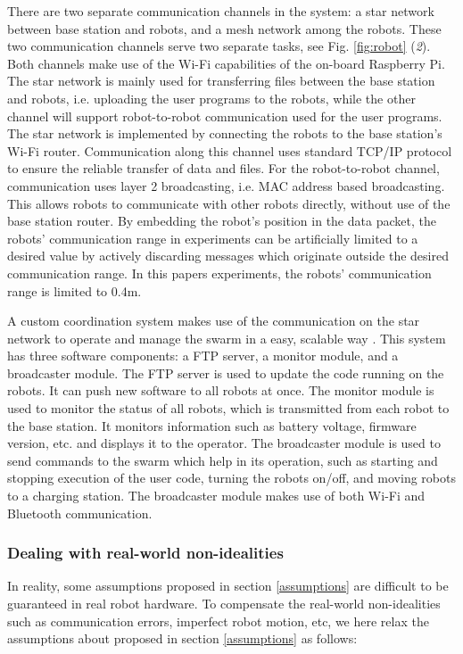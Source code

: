 \documentclass[journal]{IEEEtran}
\begin{document}
There are two separate communication channels in the system: a star network between base station and robots, and a mesh network among the robots. These two communication channels serve two separate tasks, see Fig. \ref{fig:robot} (\textit{2}).  Both channels make use of the Wi-Fi capabilities of the on-board Raspberry Pi. The star network is mainly used for transferring files between the base station and robots, i.e. uploading the user programs to the robots, while the other channel will support robot-to-robot communication used for the user programs.  The star network is implemented by connecting the robots to the base station's Wi-Fi router.  Communication along this channel uses standard TCP/IP protocol to ensure the reliable transfer of data and files.  For the robot-to-robot channel, communication uses layer 2 broadcasting, i.e. MAC address based broadcasting.  This allows robots to communicate with other robots directly, without use of the base station router.  By embedding the robot's position in the data packet, the robots' communication range in experiments can be artificially limited to a desired value by actively discarding messages which originate outside the desired communication range. In this papers experiments, the robots' communication range is limited to 0.4m. 


A custom coordination system makes use of the communication on the star network to operate and manage the swarm in a easy, scalable way \cite{swarmish, kilobot}. This system has three software components: a FTP server, a monitor module, and a broadcaster module. The FTP server is used to update the code running on the robots.  It can push new software to all robots at once.  The monitor module is used to monitor the status of all robots, which is transmitted from each robot to the base station.  It monitors information such as battery voltage, firmware version, etc. and displays it to the operator.  The broadcaster module is used to send commands to the swarm which help in its operation, such as starting and stopping execution of the user code, turning the robots on/off, and moving robots to a charging station.  The broadcaster module makes use of both Wi-Fi and Bluetooth communication. 

\subsubsection{Dealing with real-world non-idealities}
\label{experi}
In reality, some assumptions proposed in section \ref{assumptions} are difficult to be guaranteed in real robot hardware. To compensate the real-world non-idealities such as communication errors, imperfect robot motion, etc, we here relax the assumptions about proposed in section \ref{assumptions} as follows:
\end{document}
